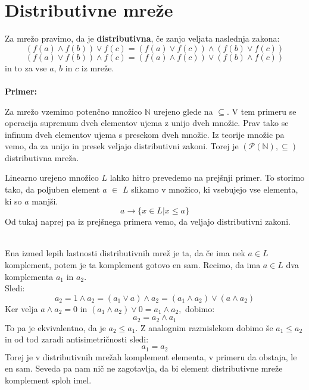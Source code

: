 \documentclass[a4paper]{article}
\newcounter{environment:definition_counter}
\newcounter{environment:theorem_counter}
\newcounter{environment:statement_counter}
\newcounter{example:example_counter}
\newenvironment{example}
{\textbf{Primer:}\\}
{\setcounter{example:example_counter}{0}}
\newenvironment{example_case}
{\refstepcounter{example:example_counter} \arabic{example:example_counter}.}
{\\}
\begin{document}
\section{Distributivne mreže}
\label{sec:distributivne_mreze}
Za mrežo pravimo, da je \textbf{distributivna}, če zanjo veljata naslednja zakona:
$$ (f(a) \land f(b)) \lor f(c) = (f(a) \lor f(c)) \land (f(b) \lor f(c))$$
$$ (f(a) \lor f(b)) \land f(c) = (f(a) \land f(c)) \lor (f(b) \land f(c))$$
in to za vse $a$, $b$ in $c$ iz mreže. \\ \\
\begin{example}
\begin{example_case}
Za mrežo vzemimo potenčno množico $\mathbb{N}$ urejeno glede na $\subseteq$. V tem primeru se operacija supremum dveh elementov ujema z unijo dveh množic. Prav tako se infinum dveh elementov ujema s presekom dveh množic. Iz teorije množic pa vemo, da za unijo in presek veljajo distributivni zakoni. Torej je $(\mathcal{P}(\mathbb{N}),\subseteq)$ distributivna mreža.
\end{example_case}
\begin{example_case}
Linearno urejeno množico $L$ lahko hitro prevedemo na prejšnji primer. To storimo tako, da poljuben element $a$ $\in$ $L$ slikamo v množico, ki vsebujejo vse elementa, ki so $a$ manjši.
$$ a \rightarrow \{ x \in L  |  x \leq a \}$$
Od tukaj naprej pa iz prejšnega primera vemo, da veljajo distributivni zakoni.
\end{example_case}\\
Ena izmed lepih lastnosti distributivnih mrež je ta, da če ima nek $a \in L$ komplement, potem je ta komplement gotovo en sam. Recimo, da ima $a \in L$ dva komplementa $a_{1}$ in $a_{2}$.\\
Sledi:
$$ a_{2} = 1 \land a_{2} = (a_{1} \lor a) \land a_{2} = (a_{1} \land a_{2}) \lor (a \land a_{2}) $$
Ker velja $a \land a_{2} = 0$ in $(a_{1} \land a_{2}) \lor 0 = a_{1} \land a_{2},$ dobimo:
$$ a_{2} = a_{2} \land a_{1} $$ 
To pa je ekvivalentno, da je $a_{2} \leq a_{1}$. Z analognim razmislekom dobimo še $a_{1} \leq a_{2}$ in od tod zaradi antisimetričnosti sledi:
$$ a_{1} = a_{2} $$
Torej je v distributivnih mrežah komplement elementa, v primeru da obstaja, le en sam. Seveda pa nam nič ne zagotavlja, da bi element distributivne mreže komplement sploh imel.
\end{example}
\end{document}

